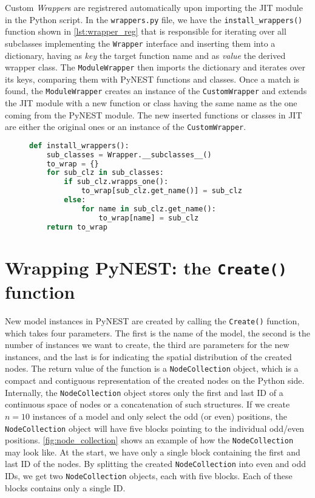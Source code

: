 Custom \emph{Wrapper}s are registrered automatically upon importing the JIT module in the Python script. In the \texttt{wrappers.py} file, we have the \texttt{install\_wrappers()} function shown in \autoref{lst:wrapper_reg} that is responsible for iterating over all subclasses implementing the \texttt{Wrapper} interface and inserting them into a dictionary, having as \emph{key} the target function name and as \emph{value} the derived wrapper class. The \texttt{ModuleWrapper} then imports the dictionary and iterates over its keys, comparing them with PyNEST functions and classes. Once a match is found, the \texttt{ModuleWrapper} creates an instance of the \texttt{CustomWrapper} and extends the JIT module with a new function or class having the same name as the one coming from the PyNEST module. The new inserted functions or classes in JIT are either the original ones or an instance of the \texttt{CustomWrapper}.

\begin{figure}[ht!]
    \centering
    \begin{lstlisting}[language=Python, label=lst:wrapper_reg, caption={Registering Wrappers}]
def install_wrappers():
    sub_classes = Wrapper.__subclasses__()
    to_wrap = {}
    for sub_clz in sub_classes:
        if sub_clz.wrapps_one():
            to_wrap[sub_clz.get_name()] = sub_clz
        else:
            for name in sub_clz.get_name():
                to_wrap[name] = sub_clz
    return to_wrap
\end{lstlisting}
\end{figure}

\section{Wrapping PyNEST: the \texttt{Create()} function}

New model instances in PyNEST are created by calling the \texttt{Create()} function, which takes four parameters. The first is the name of the model, the second is the number of instances we want to create, the third are parameters for the new instances, and the last is for indicating the spatial distribution of the created nodes. The return value of the function is a \texttt{NodeCollection} object, which is a compact and contiguous representation of the created nodes on the Python side. Internally, the \texttt{NodeCollection} object stores only the first and last ID of a continuous space of nodes or a concatenation of such structures. If we create $n=10$ instances of a model and only select the odd (or even) positions, the \texttt{NodeCollection} object will have five blocks pointing to the individual odd/even positions. \autoref{fig:node_collection} shows an example of how the \texttt{NodeCollection} may look like. At the start, we have only a single block containing the first and last ID of the nodes. By splitting the created \texttt{NodeCollection} into even and odd IDs, we get two \texttt{NodeCollection} objects, each with five blocks. Each of these blocks contains only a single ID.

